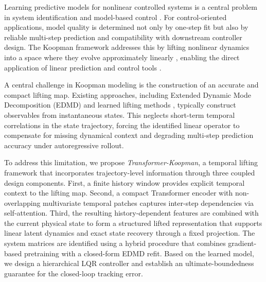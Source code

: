 \documentclass[journal]{IEEEtran}
\begin{document}
Learning predictive models for nonlinear controlled systems is a central problem in system identification and model-based control \cite{ljung1999system, vanoverschee1994n4sid, nelles2020nonlinear}. For control-oriented applications, model quality is determined not only by one-step fit but also by reliable multi-step prediction and compatibility with downstream controller design. The Koopman framework addresses this by lifting nonlinear dynamics into a space where they evolve approximately linearly \cite{koopman1931hamiltonian, brunton2022modern}, enabling the direct application of linear prediction and control tools \cite{otto2021koopman, korda2018linear}.

A central challenge in Koopman modeling is the construction of an accurate and compact lifting map. Existing approaches, including Extended Dynamic Mode Decomposition (EDMD) \cite{williams2015data} and learned lifting methods \cite{lusch2018deep, takeishi2017koopman}, typically construct observables from instantaneous states. This neglects short-term temporal correlations in the state trajectory, forcing the identified linear operator to compensate for missing dynamical context and degrading multi-step prediction accuracy under autoregressive rollout.

To address this limitation, we propose \emph{Transformer-Koopman}, a temporal lifting framework that incorporates trajectory-level information through three coupled design components. First, a finite history window provides explicit temporal context to the lifting map. Second, a compact Transformer encoder with non-overlapping multivariate temporal patches captures inter-step dependencies via self-attention. Third, the resulting history-dependent features are combined with the current physical state to form a structured lifted representation that supports linear latent dynamics and exact state recovery through a fixed projection. The system matrices are identified using a hybrid procedure that combines gradient-based pretraining with a closed-form EDMD refit. Based on the learned model, we design a hierarchical LQR controller and establish an ultimate-boundedness guarantee for the closed-loop tracking error.
\end{document}
